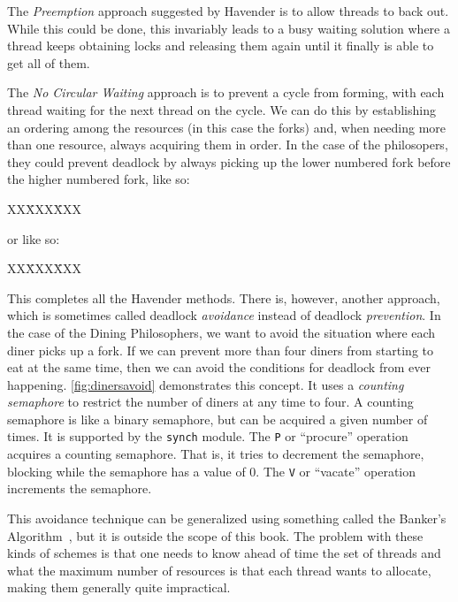 \documentclass{report}
\newcommand{\harmonysource}[1]{
\begin{tabbing}
XX\=XXX\=XXX\kill
    
\end{tabbing}
}
\newenvironment{code}{
\tcolorbox
}{
\endtcolorbox
}
\begin{document}
The \emph{Preemption} approach suggested by Havender is to allow threads to back out.
While this could be done, this invariably leads to a busy waiting solution
where a thread keeps obtaining locks and releasing them again until it
finally is able to get all of them.

The \emph{No Circular Waiting} approach
is to prevent a cycle from forming, with each
thread waiting for the next thread on the cycle.
We can do this by establishing an ordering among the
resources (in this case the forks) and, when needing more than one
resource, always acquiring them in order.  In the case of the philosopers,
they could prevent deadlock by always picking up the lower numbered fork
before the higher numbered fork, like so:

\vspace{1em}
\begin{code}
\harmonysource{dinersfix}
\end{code}
\vspace{1em}

or like so:

\vspace{1em}
\begin{code}
\harmonysource{dinersfix2}
\end{code}
\vspace{1em}

This completes all the Havender methods.
There is, however, another approach, which is sometimes called deadlock
\emph{avoidance}
%
instead of deadlock \emph{prevention}.
In the case of the Dining Philosophers, we want to avoid the situation where each
diner picks up a fork.  If we can prevent more than four diners from starting to
eat at the same time, then we can avoid the conditions for deadlock from ever
happening.
\autoref{fig:dinersavoid} demonstrates this concept.  It uses a
\emph{counting semaphore} to restrict the number of diners at any time to
four.  A counting semaphore is like a binary semaphore, but can be
acquired a given number of times.  It is supported by the \texttt{synch}
module.  The \texttt{P} or ``procure'' operation acquires a counting
semaphore.  That is, it tries to decrement the semaphore, blocking while
the semaphore has a value of 0.  The \texttt{V} or ``vacate'' operation
increments the semaphore.

This avoidance technique can be generalized using something called the
Banker's Algorithm~\cite{EWD108}, but it is outside the scope of this book.
The problem with these kinds of schemes is that one needs to know ahead of time
the set of threads and what the maximum number of resources is that each thread
wants to allocate, making them generally quite impractical.
\end{document}
